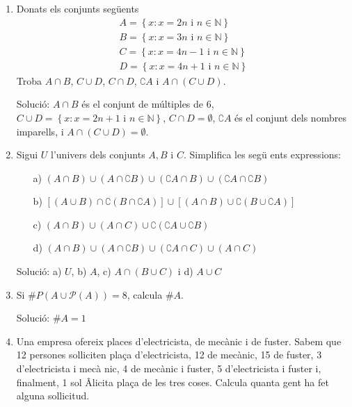 

\begin{enumerate}
\item Donats els conjunts seg\"{u}ents%
\begin{equation*}
\begin{array}{l}
A=\left\{ x:x=2n\text{ \ i \ }n\in \mathbb{N}\right\} \\
B=\left\{ x:x=3n\text{ \ i \ }n\in \mathbb{N}\right\} \\
C=\left\{ x:x=4n-1\text{ \ i \ }n\in \mathbb{N}\right\} \\
D=\left\{ x:x=4n+1\text{ \ i \ }n\in \mathbb{N}\right\}%
\end{array}%
\end{equation*}%
Troba $A\cap B$, $C\cup D$, $C\cap D$, $\complement A$ i $A\cap (C\cup D)$.

Soluci\'{o}: $A\cap B$ \'{e}s el conjunt de m\'{u}ltiples de 6, $C\cup
D=\left\{ x:x=2n+1\text{ \ i \ }n\in \mathbb{N}\right\} $, $C\cap
D=\emptyset $, $\complement A$ \'{e}s el conjunt dels nombres imparells, i $%
A\cap (C\cup D)=\emptyset $.

\item Sigui $U$ l'univers dels conjunts $A,B$ i $C$. Simplifica les seg\"{u}%
ents expressions:

\begin{enumerate}
\item[a)] $(A\cap B)\cup (A\cap \complement B)\cup (\complement A\cap B)\cup
(\complement A\cap \complement B)$

\item[b)] $\left[ (A\cup B)\cap \complement \left( B\cap \complement
A\right) \right] \cup \left[ (A\cap B)\cup \complement \left( B\cup
\complement A\right) \right] $

\item[c)] $(A\cap B)\cup (A\cap C)\cup \complement \left( \complement A\cup
\complement B\right) $

\item[d)] $(A\cap B)\cup (A\cap \complement B)\cup (\complement A\cap C)\cup
(A\cap C)$
\end{enumerate}

Soluci\'{o}: a) $U$, b) $A$, c) $A\cap (B\cup C)$ i d) $A\cup C$

\item Si $\#P\left( A\cup \mathcal{P}(A)\right) =8$, calcula $\#A$.

Soluci\'{o}: $\#A=1$

\item Una empresa ofereix places d'electricista, de mec\`{a}nic i de fuster.
Sabem que 12 persones sol\textperiodcentered liciten pla\c{c}a
d'electricista, 12 de mec\`{a}nic, 15 de fuster, 3 d'electricista i mec\`{a}%
nic, 4 de mec\`{a}nic i fuster, 5 d'electricista i fuster i, finalment, 1 sol%
\^{A}\textperiodcentered licita pla\c{c}a de les tres coses. Calcula quanta
gent ha fet alguna sol\textperiodcentered licitud.


\end{enumerate}
